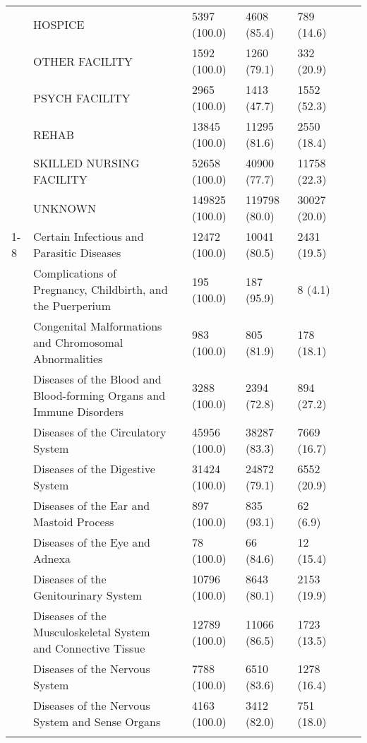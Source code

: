 \begin{tabular}{llllllll}
{{{ & HOSPICE &  & 5397 (100.0) & 4608 (85.4) & 789 (14.6) &  &  \\
 & OTHER FACILITY &  & 1592 (100.0) & 1260 (79.1) & 332 (20.9) &  &  \\
 & PSYCH FACILITY &  & 2965 (100.0) & 1413 (47.7) & 1552 (52.3) &  &  \\
 & REHAB &  & 13845 (100.0) & 11295 (81.6) & 2550 (18.4) &  &  \\
 & SKILLED NURSING FACILITY &  & 52658 (100.0) & 40900 (77.7) & 11758 (22.3) &  &  \\
 & UNKNOWN &  & 149825 (100.0) & 119798 (80.0) & 30027 (20.0) &  &  \\
\cline{1-8}
\multirow[t]{29}{*}{mdc_category, n (%
 & Certain Infectious and Parasitic Diseases &  & 12472 (100.0) & 10041 (80.5) & 2431 (19.5) &  &  \\
 & Complications of Pregnancy, Childbirth, and the Puerperium &  & 195 (100.0) & 187 (95.9) & 8 (4.1) &  &  \\
 & Congenital Malformations and Chromosomal Abnormalities &  & 983 (100.0) & 805 (81.9) & 178 (18.1) &  &  \\
 & Diseases of the Blood and Blood-forming Organs and Immune Disorders &  & 3288 (100.0) & 2394 (72.8) & 894 (27.2) &  &  \\
 & Diseases of the Circulatory System &  & 45956 (100.0) & 38287 (83.3) & 7669 (16.7) &  &  \\
 & Diseases of the Digestive System &  & 31424 (100.0) & 24872 (79.1) & 6552 (20.9) &  &  \\
 & Diseases of the Ear and Mastoid Process &  & 897 (100.0) & 835 (93.1) & 62 (6.9) &  &  \\
 & Diseases of the Eye and Adnexa &  & 78 (100.0) & 66 (84.6) & 12 (15.4) &  &  \\
 & Diseases of the Genitourinary System &  & 10796 (100.0) & 8643 (80.1) & 2153 (19.9) &  &  \\
 & Diseases of the Musculoskeletal System and Connective Tissue &  & 12789 (100.0) & 11066 (86.5) & 1723 (13.5) &  &  \\
 & Diseases of the Nervous System &  & 7788 (100.0) & 6510 (83.6) & 1278 (16.4) &  &  \\
 & Diseases of the Nervous System and Sense Organs &  & 4163 (100.0) & 3412 (82.0) & 751 (18.0) &  &  \\
}}}}
\end{tabular}
